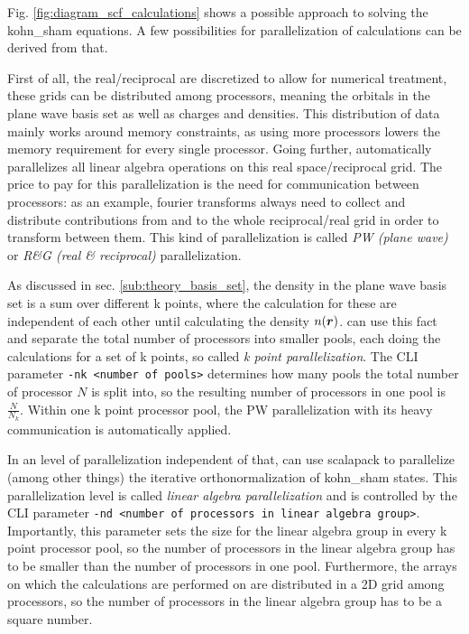 \documentclass[main.tex]{subfiles}
\begin{document}
Fig. \ref{fig:diagram_scf_calculations} shows a possible approach to solving the \acrshort{kohn_sham} equations.
A few possibilities for parallelization of calculations can be derived from that.

First of all, the real/reciprocal are discretized to allow for numerical treatment, these grids can be distributed among processors, meaning the orbitals in the plane wave basis set as well as charges and densities.
This distribution of data mainly works around memory constraints, as using more processors lowers the memory requirement for every single processor.
Going further, \QE automatically parallelizes all linear algebra operations on this real space/reciprocal grid.
The price to pay for this parallelization is the need for communication between processors: as an example, fourier transforms always need to collect and distribute contributions from and to the whole reciprocal/real grid in order to transform between them.
This kind of parallelization is called \emph{PW (plane wave)} or \emph{R\&G (real \& reciprocal)} parallelization. 

As discussed in sec. \ref{sub:theory_basis_set}, the density in the plane wave basis set is a sum over different k points, where the calculation for these are independent of each other until calculating the density \(n( \vb*{r})\).
\QE can use this fact and separate the total number of processors into smaller pools, each doing the calculations for a set of k points, so called \emph{k point parallelization}.
The CLI parameter \texttt{-nk <number of pools>} determines how many pools the total number of processor \(N\) is split into, so the resulting number of processors in one pool is \(\frac{N}{N_k}\).
Within one k point processor pool, the PW parallelization with its heavy communication is automatically applied.

In an level of parallelization independent of that, \QE can use \gls{scalapack} to parallelize (among other things) the iterative orthonormalization of \acrshort{kohn_sham} states.
This parallelization level is called \emph{linear algebra parallelization} and is controlled by the CLI parameter \texttt{-nd <number of processors in linear algebra group>}.
Importantly, this parameter sets the size for the linear algebra group in every k point processor pool, so the number of processors in the linear algebra group has to be smaller than the number of processors in one pool.
Furthermore, the arrays on which the calculations are performed on are distributed in a 2D grid among processors, so the number of processors in the linear algebra group has to be a square number.
\end{document}
